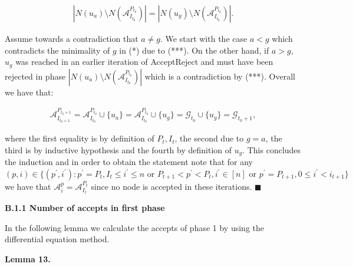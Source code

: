 \documentclass[10pt,a4paper]{article}
\begin{document}
\[\begin{gathered}
\displaystyle|N(u_{a})\setminus N(\mathcal{A}^{P_{t_{0}}}_{I_{t_{0}}})|=|N(u_{g})\setminus N(\mathcal{A}^{P_{t_{0}}}_{I_{t_{0}}})|.
\end{gathered}\]


Assume towards a contradiction that $a\neq g$.
We start with the case $a<g$ which contradicts the minimality of $g$ in (*) due to (***).
On the other hand, if $a>g$, $u_{g}$ was reached in an earlier iteration of AcceptReject and must have been rejected in phase $|N(u_{a})\setminus N(\mathcal{A}^{P_{t_{0}}}_{I_{t_{0}}})|$ which is a contradiction by (***).
Overall we have that:\par


\[\begin{gathered}
\displaystyle\mathcal{A}^{P_{t_{0}+1}}_{I_{t_{0}+1}}=\mathcal{A}^{P_{t_{0}}}_{I_{t_{0}}}\cup\{u_{a}\}=\mathcal{A}^{P_{t_{0}}}_{I_{t_{0}}}\cup\{u_{g}\}=\mathcal{G}_{t_{0}}\cup\{u_{g}\}=\mathcal{G}_{t_{0}+1},
\end{gathered}\]


where the first equality is by definition of $P_{t},I_{t}$, the second due to $g=a$, the third is by inductive hypothesis and the fourth by definition of $u_{g}$.
This concludes the induction and in order to obtain the statement note that for any $(p,i)\in\{(p^{\prime},i^{\prime}):p^{\prime}=P_{t},I_{t}\leq i^{\prime}\leq n\text{ or }P_{t+1}<p^{\prime}<P_{t},i^{\prime}\in[n]\text{ or }p^{\prime}=P_{t+1},0\leq i^{\prime}<i_{t+1}\}$ we have that $\mathcal{A}^{p}_{i}=\mathcal{A}^{P_{t}}_{I_{t}}$ since no node is accepted in these iterations.
\ensuremath{\blacksquare}\par





\par\medskip\noindent\textbf{B.1.1 Number of accepts in first phase}\par




In the following lemma we calculate the accepts of phase 1 by using the differential equation method.\par





\par\medskip\noindent\textbf{\textbf{Lemma 13}\textbf{.}}\par
\end{document}

